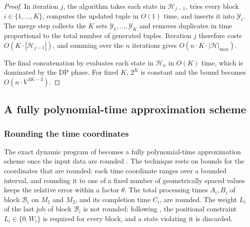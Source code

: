 \documentclass[12pt]{article}
\begin{document}
\begin{sloppypar}
\begin{proof}
            In iteration $j$, the algorithm takes each state in $\mathscr{H}_{j-1}$, tries every block
            $i \in \{1,\dots,K\}$, computes the updated tuple in $O(1)$ time, and inserts it into
            $\mathcal{Y}_i$. The merge step collects the $K$ sets $\mathcal{Y}_1,\dots,\mathcal{Y}_K$ and removes
            duplicates in time proportional to the total number of generated tuples. Iteration $j$ therefore
            costs $O(K \cdot |\mathscr{H}_{j-1}|)$, and summing over the $n$ iterations gives
            $O(n \cdot K \cdot |\mathscr{H}|_{\max})$.
            
            The final concatenation by  evaluates each state in
            $\mathscr{H}_{n}$ in $O(K)$ time, which is dominated by the DP phase. For fixed $K$, $2^K$ is
            constant and the bound becomes $O(n \cdot V^{\,3K-3})$.
        \end{proof}
        
        
        
        \subsection{A fully polynomial-time approximation scheme}
        \label{sub:fptas}
        
        \subsubsection{Rounding the time coordinates}
        \label{subsub:fptas-time}
        
        The exact dynamic program of  becomes a fully polynomial-time approximation
        scheme once the input data are rounded \citep{hall1994}. The technique rests on bounds for the
        coordinates that are rounded: each time coordinate ranges over a bounded interval, and rounding
        it to one of a fixed number of geometrically spaced values keeps the relative error within a
        factor $\theta$. The total processing times $A_i,B_i$ of block $\mathcal{B}_i$ on $M_1$
        and $M_2$, and its completion time $C_i$, are rounded. The weight $L_i$ of the
        last job of block $\mathcal{B}_i$ is not rounded; following
        , the positional constraint $L_i\in\{0,W_i\}$ is required
        for every block, and a state violating it is discarded.
        

\end{sloppypar}
\end{document}
